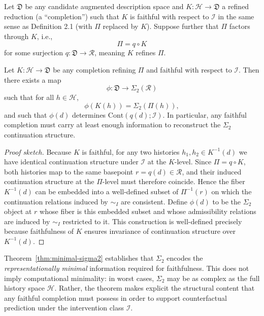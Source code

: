 Let $\mathfrak{D}$ be any candidate augmented description space and $K:\mathcal{H}\to\mathfrak{D}$
a refined reduction (a ``completion'') such that $K$ is faithful with respect to $\mathcal{I}$
in the same sense as Definition 2.1 (with $\Pi$ replaced by $K$). Suppose further that
$\Pi$ factors through $K$, i.e.,
\begin{equation}
\Pi = q \circ K
\end{equation}
for some surjection $q:\mathfrak{D}\to\mathcal{R}$, meaning $K$ refines $\Pi$.

\begin{theorem}
\label{thm:minimal-sigma2}
Let $K:\mathcal{H}\to\mathfrak{D}$ be any completion refining $\Pi$ and faithful with respect
to $\mathcal{I}$. Then there exists a map
\begin{equation}
\phi:\mathfrak{D}\to \Sigma_2(\mathcal{R})
\end{equation}
such that for all $h\in\mathcal{H}$,
\begin{equation}
\phi(K(h)) = \Sigma_2(\Pi(h)),
\end{equation}
and such that $\phi(d)$ determines $\mathrm{Cont}(q(d);\mathcal{I})$.
In particular, any faithful completion must carry at least enough information to reconstruct
the $\Sigma_2$ continuation structure.
\end{theorem}

\begin{proof}[Proof sketch]
Because $K$ is faithful, for any two histories $h_1,h_2\in K^{-1}(d)$ we have identical continuation
structure under $\mathcal{I}$ at the $K$-level. Since $\Pi=q\circ K$, both histories map to the same
basepoint $r=q(d)\in\mathcal{R}$, and their induced continuation structure at the $\Pi$-level must
therefore coincide. Hence the fiber $K^{-1}(d)$ can be embedded into a well-defined subset of
$\Pi^{-1}(r)$ on which the continuation relations induced by $\sim_I$ are consistent. Define $\phi(d)$
to be the $\Sigma_2$ object at $r$ whose fiber is this embedded subset and whose admissibility relations
are induced by $\sim_I$ restricted to it. This construction is well-defined precisely because
faithfulness of $K$ ensures invariance of continuation structure over $K^{-1}(d)$.
\end{proof}

Theorem~\ref{thm:minimal-sigma2} establishes that $\Sigma_2$ encodes the \emph{representationally minimal} information
required for faithfulness. This does not imply computational minimality: in worst cases,
$\Sigma_2$ may be as complex as the full history space $\mathcal{H}$. Rather, the theorem makes
explicit the structural content that any faithful completion must possess in order to support
counterfactual prediction under the intervention class $\mathcal{I}$.

